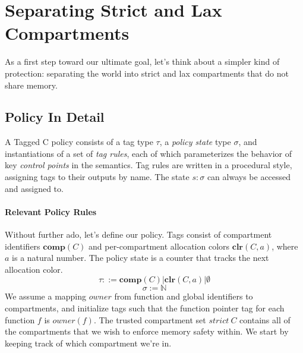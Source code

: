\documentclass{article}
\begin{document}
\section{Separating Strict and Lax Compartments}

As a first step toward our ultimate goal, let's think about a simpler kind of protection:
separating the world into strict and lax compartments that do not share memory.

\subsection{Policy In Detail}

A Tagged C policy consists of a tag type \(\tau\), a {\it policy state} type \(\sigma\),
and instantiations of a set of {\it tag rules}, each of which parameterizes the behavior
of key {\it control points} in the semantics. Tag rules are written in a procedural style,
assigning tags to their outputs by name. The state \(s : \sigma\) can always be accessed
and assigned to.

\paragraph{Relevant Policy Rules}

Without further ado, let's define our policy. Tags consist of compartment identifiers
\(\mathbf{comp}(C)\) and per-compartment allocation colors \(\mathbf{clr}(C,a)\), where
\(a\) is a natural number. The policy state is a counter that tracks the next allocation color.
\[\tau ::= \mathbf{comp}(C) | \mathbf{clr}(C,a) | \emptyset \]
\[\sigma := \mathbb{N} \]
We assume a mapping \(owner\) from function and global identifiers to compartments,
and initialize tags such that the function pointer tag for each function \(f\) is \(owner(f)\).
The trusted compartment set \(\mathit{strict} ~ C\) contains all of the compartments that
we wish to enforce memory safety within. We start by keeping track of which compartment we're in.

\begin{minipage}{0.49\textwidth}
\end{minipage}
\begin{minipage}{0.49\textwidth}
  \rettruleblock{\(\PCT['] := \PCT[_{CLR}]\)}
\end{minipage}
\end{document}
